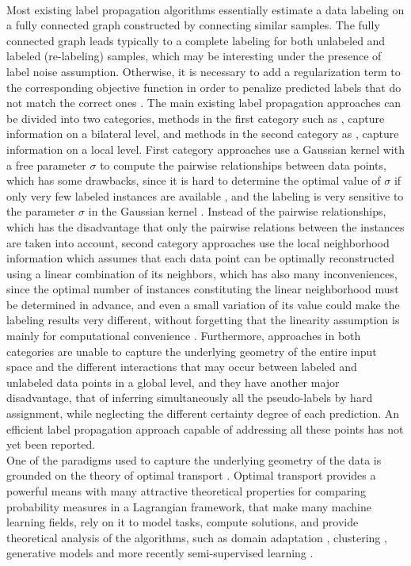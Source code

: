 \documentclass[conference]{IEEEtran}
\begin{document}
\\ Most existing label propagation algorithms essentially estimate a data labeling on a fully connected graph constructed by connecting similar samples. The fully connected graph leads typically to a complete labeling for both unlabeled and labeled (re-labeling) samples, which may be interesting under the presence of label noise assumption. Otherwise, it is necessary to add a regularization term to the corresponding objective function in order to penalize predicted labels that do not match the correct ones \cite{van2020survey}. The main existing label propagation approaches can be divided into two categories, methods in the first category such as \cite{zhu2002learning}\cite{zhou2003learning}, capture information on a bilateral level, and methods in the second category as \cite{wang2007label}, capture information on a local level. First category approaches use a Gaussian kernel with a free parameter $\sigma$ to compute the pairwise relationships between data points, which has some drawbacks, since it is hard to determine the optimal value of $\sigma$ if only very few labeled instances are available \cite{zhou2003learning}, and the labeling is very sensitive to the parameter $\sigma$ in the Gaussian kernel \cite{wang2007label}. Instead of the pairwise relationships, which has the disadvantage that only the pairwise relations between the instances are taken into account, second category approaches use the local neighborhood information which assumes that each data point can be optimally reconstructed using a linear combination of its neighbors, which has also many inconveniences, since the optimal number of instances constituting the linear neighborhood must be determined in advance, and even a small variation of its value could make the labeling results very different, without forgetting that the linearity assumption is mainly for computational convenience \cite{wang2007label}. Furthermore, approaches in both categories are unable to capture the underlying geometry of the entire input space and the different interactions that may occur between labeled and unlabeled data points in a global level, and they have another major disadvantage, that of inferring simultaneously all the pseudo-labels by hard assignment, while neglecting the different certainty degree of each prediction. An efficient label propagation approach capable of addressing all these points has not yet been reported.
\\ One of the paradigms used to capture the underlying geometry of the data is grounded on the theory of optimal transport \cite{villani2008optimal} \cite{santambrogio2015optimal}. Optimal  transport provides a powerful means with many attractive theoretical properties for comparing probability measures in a Lagrangian framework, that make many machine learning fields, rely on it to model tasks, compute solutions, and provide theoretical analysis of the algorithms, such as domain adaptation \cite{courty2016optimal}\cite{NIPS2017_0070d23b}\cite{redko2019optimal}\cite{redko2017theoretical}, clustering \cite{laclau2017co}\cite{bouazza2019multi}\cite{bouazza2020collaborative}, generative models \cite{martin2017wasserstein} and more recently semi-supervised learning \cite{solomon2014wasserstein} \cite{taherkhani2020transporting}.
\end{document}
